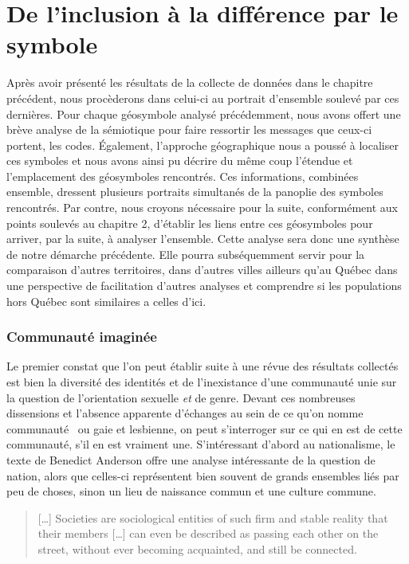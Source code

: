 
\chapter{De l'inclusion à la différence par le symbole}
\label{cha:de_l_inclusion_la_diff_rence_par_le_symbole}

Après avoir présenté les résultats de la collecte de données dans le chapitre précédent, nous procèderons dans celui-ci au portrait d'ensemble soulevé par ces dernières.
Pour chaque géosymbole analysé précédemment, nous avons offert une brève analyse de la sémiotique pour faire ressortir les messages que ceux-ci portent, les codes.
Également, l'approche géographique nous a poussé à localiser ces symboles et nous avons ainsi pu décrire du même coup l'étendue et l'emplacement des géosymboles rencontrés.
Ces informations, combinées ensemble, dressent plusieurs portraits simultanés de la panoplie des symboles rencontrés.
Par contre, nous croyons nécessaire pour la suite, conformément aux points soulevés au chapitre 2, d'établir les liens entre ces géosymboles pour arriver, par la suite, à analyser l'ensemble.
Cette analyse sera donc une synthèse de notre démarche précédente.
Elle pourra subséquemment servir pour la comparaison d'autres territoires, dans d'autres villes ailleurs qu'au Québec dans une perspective de facilitation d'autres analyses et comprendre si les populations \lgbt{} hors Québec sont similaires a celles d'ici.


\subsection{Communauté imaginée}
\label{sub:communaut_imagin_e}
Le premier constat que l'on peut établir suite à une révue des résultats collectés est bien la diversité des identités \lgbt{} et de l'inexistance d'une communauté unie sur la question de l'orientation sexuelle \emph{et} de genre.
Devant ces nombreuses dissensions et l'absence apparente d'échanges au sein de ce qu'on nomme communauté~\lgbt{} ou gaie et lesbienne, on peut s'interroger sur ce qui en est de cette communauté, s'il en est vraiment une.
S'intéressant d'abord au nationalisme, le texte de Benedict Anderson offre une analyse intéressante de la question de nation, alors que celles-ci représentent bien souvent de grands ensembles liés par peu de choses, sinon un lieu de naissance commun et une culture commune.
\begin{quote}
  [\ldots] Societies are sociological entities of such firm and stable reality that their members [\ldots] can even be described as passing each other on the street, without ever becoming acquainted, and still be connected.~\citep[25]{Anderson1983}
\end{quote}

